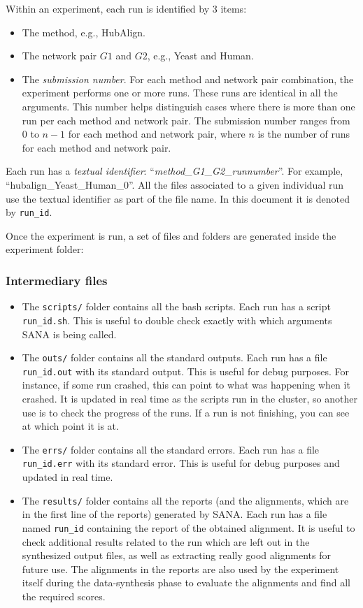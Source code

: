 \documentclass[]{article}
\begin{document}
Within an experiment, each run is identified by 3 items:
\begin{itemize}
\item The method, e.g., HubAlign.
\item The network pair $G1$ and $G2$, e.g., Yeast and Human.
\item The \textit{submission number}. For each method and network pair combination, the experiment performs one or more runs. These runs are identical in all the arguments. This number helps distinguish cases where there is more than one run per each method and network pair. The submission number ranges from 0 to $n-1$ for each method and network pair, where $n$ is the number of runs for each method and network pair.
\end{itemize}
Each run has a \textit{textual identifier}: ``\textit{method}\_\textit{G1}\_\textit{G2}\_\textit{runnumber}''. For example, ``hubalign\_Yeast\_Human\_0''. All the files associated to a given individual run use the textual identifier as part of the file name. In this document it is denoted by \verb|run_id|.

Once the experiment is run, a set of files and folders are generated inside the experiment folder:

\subsubsection*{Intermediary files}
\begin{itemize}
\item The \verb|scripts/| folder contains all the bash scripts. Each run has a script \verb|run_id.sh|. This is useful to double check exactly with which arguments SANA is being called.
\item The \verb|outs/| folder contains all the standard outputs. Each run has a file \verb|run_id.out| with its standard output. This is useful for debug purposes. For instance, if some run crashed, this can point to what was happening when it crashed. It is updated in real time as the scripts run in the cluster, so another use is to check the progress of the runs. If a run is not finishing, you can see at which point it is at.
\item The \verb|errs/| folder contains all the standard errors. Each run has a file \verb|run_id.err| with its standard error. This is useful for debug purposes and updated in real time.
\item The \verb|results/| folder contains all the reports (and the alignments, which are in the first line of the reports) generated by SANA. Each run has a file named \verb|run_id| containing the report of the obtained alignment. It is useful to check additional results related to the run which are left out in the synthesized output files, as well as extracting really good alignments for future use. The alignments in the reports are also used by the experiment itself during the data-synthesis phase to evaluate the alignments and find all the required scores.
\end{itemize}
\end{document}

